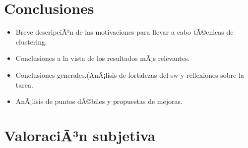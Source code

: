 \documentclass[10pt,a4paper]{article}
\begin{document}
%
%
%
%



\section{Conclusiones}

	\begin{itemize}
		\item Breve descripciÃ³n de las motivaciones para llevar a cabo tÃ©cnicas de clustering.
		\item Conclusiones a la vista de los resultados mÃ¡s relevantes.
		\item Conclusiones generales.(AnÃ¡lisis de fortalezas del sw y reflexiones sobre la tarea.
		\item AnÃ¡lisis de puntos dÃ©biles y propuestas de mejoras.
	\end{itemize}

\section{ValoraciÃ³n subjetiva}
\end{document}
